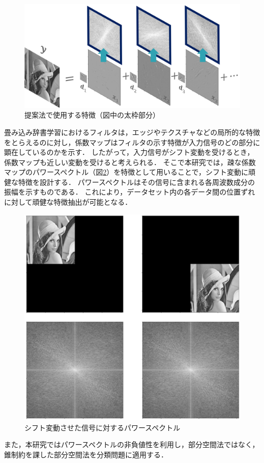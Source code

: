 \begin{figure}[htb]
	\centering
	\includegraphics[width=0.7\linewidth]{image/power-spectrum}
	\caption{提案法で使用する特徴（図中の太枠部分）}
	\label{fig:power-spectrum}
\end{figure}

畳み込み辞書学習におけるフィルタは，エッジやテクスチャなどの局所的な特徴をとらえるのに対し，係数マップはフィルタの示す特徴が入力信号のどの部分に顕在しているのかを示す．
したがって，入力信号がシフト変動を受けるとき，係数マップも近しい変動を受けると考えられる．
そこで本研究では，疎な係数マップのパワースペクトル（図\ref{fig:shift}）を特徴として用いることで，シフト変動に頑健な特徴を設計する．
パワースペクトルはその信号に含まれる各周波数成分の振幅を示すものである．
これにより，データセット内の各データ間の位置ずれに対して頑健な特徴抽出が可能となる．

\begin{figure}[htb]
	\centering
	\includegraphics[width=0.7\linewidth]{image/shift}
	\caption{シフト変動させた信号に対するパワースペクトル}
	\label{fig:shift}
\end{figure}

また，本研究ではパワースペクトルの非負値性を利用し，部分空間法ではなく，錐制約を課した部分空間法を分類問題に適用する．
